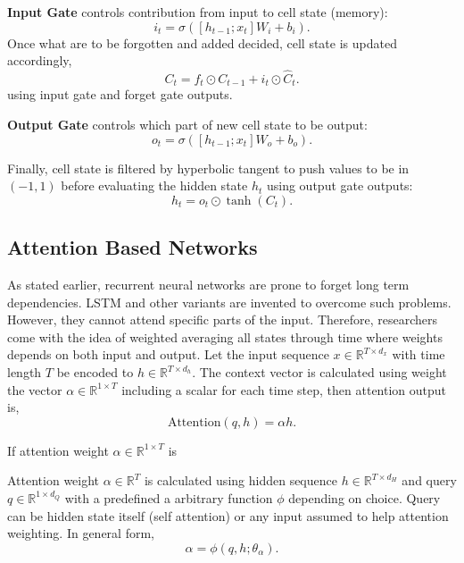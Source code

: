 \textbf{Input Gate} controls contribution from input to cell state (memory): 
\begin{equation}
\label{eqn:lstm_inp}
i_t = \sigma( [h_{t-1}; x_t] W_i + b_{i}).
\end{equation}
Once what are to be forgotten and added decided, cell state is updated accordingly, 
\begin{equation}
\label{eqn:lstm_cellstupt}
C_t = f_t \odot C_{t-1} + i_t \odot \hat{C}_t.
\end{equation}
using input gate and forget gate outputs.

\textbf{Output Gate} controls which part of new cell state to be output: 
\begin{equation}
\label{eqn:lstm_out}
o_t = \sigma( [h_{t-1}; x_t] W_o + b_o).
\end{equation}

Finally, cell state is filtered by hyperbolic tangent to push values to be in $(-1,1)$ before evaluating the hidden state $h_t$ using output gate outputs: 
\begin{equation}
h_t = o_t \odot \tanh(C_t).
\end{equation}

\subsection{Attention Based Networks}

As stated earlier, recurrent neural networks are prone to forget long term dependencies. 
LSTM and other variants are invented to overcome such problems. 
However, they cannot attend specific parts of the input. 
Therefore, researchers come with the idea of weighted averaging all states through time where weights depends on both input and output. 
Let the input sequence $x \in \mathbb{R}^{T \times d_x}$ with time length $T$ be encoded to $h \in \mathbb{R}^{T \times d_h}$. 
The context vector is calculated using weight the vector $\alpha \in \mathbb{R}^{1 \times T}$ including a scalar for each time step, then attention output is, 
\begin{equation}
\mathrm{Attention}(q, h) = \alpha h. %
\label{eq:attention_generic}
\end{equation}

If attention weight $\alpha \in \mathbb{R}^{1 \times T}$ is  

Attention weight $\alpha \in \mathbb{R}^{T}$ is calculated using hidden sequence
$h \in \mathbb{R}^{T \times d_H}$ and query $q \in \mathbb{R}^{1 \times d_Q}$ with a predefined a arbitrary function $\phi$ depending on choice. 
Query can be hidden state itself (self attention) or any input assumed to help attention weighting. 
In general form,  
\begin{equation}
\alpha = \phi(q, h; \theta_{\alpha}).
\end{equation}

